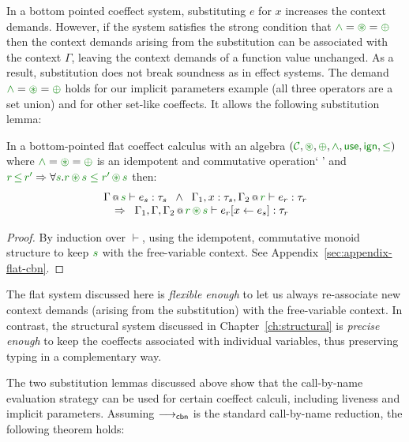 In a bottom pointed coeffect system, substituting $e$ for $x$ increases the context
demands. However, if the system satisfies the strong condition that $\czip = \cseq = \cpar$
then the context demands arising from the substitution can be associated with the context
$\Gamma$, leaving the context demands of a function value unchanged. As a result, substitution
does not break soundness as in effect systems. The demand $\czip = \cseq = \cpar$ holds for
our implicit parameters example (all three operators are a set union) and for other set-like
coeffects. It allows the following substitution lemma:

\begin{lemma}
\label{thm:cbn-substitution-bot}
In a bottom-pointed flat coeffect calculus with an algebra $(\C, \cseq, \cpar, \czip, \cunit, \czero, \cleq)$
where $\czip = \cseq = \cpar$ is an idempotent and commutative operation`  ' and
$\cclrd{r}\,\cleq\,\cclrd{r'} \Rightarrow \forall\cclrd{s}.\cclrd{r}\,\cseq\,\cclrd{s}\;\cleq\;\cclrd{r'}\,\cseq\,\cclrd{s}$ then:
%
\begin{equation*}
\begin{array}{l}
\coctx{\Gamma}{\cclrd{s}} \vdash e_s : \tau_s \;\; \wedge \;\;
\coctx{\Gamma_1,  x : \tau_s, \Gamma_2}{ \cclrd{r}  } \vdash e_r : \tau_r\\
\quad \Rightarrow \;\; \coctx{\Gamma_1,\Gamma,\Gamma_2}{ \cclrd{r} \,\cseq\, \cclrd{s} } \vdash \subst{e_r}{x}{e_s} : \tau_r
\end{array}
\end{equation*}

\end{lemma}
\begin{proof}
By induction over $\vdash$, using the idempotent, commutative monoid structure to keep $\cclrd{s}$ with
the free-variable context. See Appendix~\ref{sec:appendix-flat-cbn}.
\end{proof}

\noindent
The flat system discussed here is \emph{flexible enough} to let us always re-associate new context
demands (arising from the substitution) with the free-vari\-able context. In contrast, the
structural system discussed in Chapter~\ref{ch:structural} is \emph{precise enough} to keep the
coeffects associated with individual variables, thus preserving typing in a complementary way.

The two substitution lemmas discussed above show that the call-by-name evaluation strategy can be
used for certain coeffect calculi, including liveness and implicit parameters. Assuming
$\longrightarrow_{\textnormal{\sffamily cbn}}$ is the standard call-by-name reduction, the following theorem holds:

